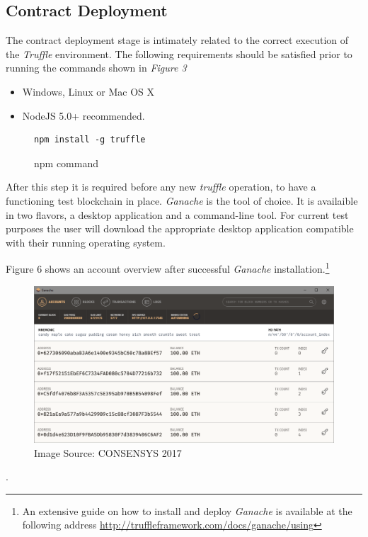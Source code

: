 \documentclass[submission,copyright,creativecommons]{eptcs}
\begin{document}
\subsection{Contract Deployment}
The contract deployment stage is intimately related to the correct execution of the \textit{Truffle} environment.  The following requirements should be satisfied prior to running the commands shown in \textit{Figure 3}
\begin{itemize}
\item Windows, Linux or Mac OS X
\item NodeJS 5.0+ recommended.
\end{itemize}

\begin{figure}[h]
\begin{tcolorbox}
\begin{verbatim}
npm install -g truffle
\end{verbatim}
\end{tcolorbox}
\caption{npm command}
\end{figure}

After this step it is required before any new \textit{truffle} operation, to have a functioning test blockchain in place.  \textit{Ganache} is the tool of choice.  It is availaible in two flavors, a desktop application and a command-line tool.  For current test purposes the user will download the appropriate desktop application compatible with their running operating system. 

Figure 6 shows an account overview after successful \textit{Ganache} installation.\footnote{An extensive guide on how to install and deploy \textit{Ganache} is available at the following address \url{http://truffleframework.com/docs/ganache/using}}
\begin{figure}[h]
    \centering
    \label{fig:ganache_dashboard}
    \includegraphics[width=5in]{ganache_accounts.png}
     \caption{Image Source: CONSENSYS 2017}
\end{figure}.
\end{document}
